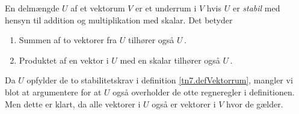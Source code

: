 \begin{theorem} \label{tn7.stabilNok}
En delmængde $U$ af et vektorum $V$ er et underrum i $V$ hvis $U$ er \textit{stabil} med hensyn til addition og multiplikation med skalar. Det betyder
\begin{enumerate}
\item
Summen af to vektorer fra $U$ tilhører også $U\,$.
\item
Produktet af en vektor i $U$ med en skalar tilhører også $U\,$.
\end{enumerate}
\end{theorem}
\begin{bevis}
Da $U$ opfylder de to stabilitetskrav i definition \ref{tn7.defVektorrum}, mangler vi blot at argumentere for at $U$ også overholder de otte regneregler i definitionen. Men dette er klart, da alle vektorer i $U$ også er vektorer i $V$ hvor de gælder.
\end{bevis}
